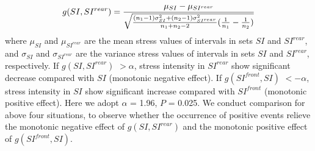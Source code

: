 \begin{equation}
\small{g(SI,SI^{rear})}= \frac{\mu_{SI}-\mu_{SI^{rear}}}{\sqrt{\frac{(n_1-1)\sigma^2_{SI}+(n_2-1)\sigma^2_{SI^{rear}}}{n_1+n_2-2}(\frac{1}{n_1}-\frac{1}{n_2})}}
\end{equation}
where $\mu_{SI}$ and $\mu_{SI^{rear}}$ are the mean stress values of intervals in sets $SI$ and $SI^{rear}$,
and $\sigma_{SI}$ and $\sigma_{SI^{rear}}$ are the variance stress values of intervals in sets $SI$ and $SI^{rear}$, respectively.
If $g(SI,SI^{rear})$ $> \alpha$, stress intensity in $SI^{rear}$ show significant decrease compared with $SI$ (monotonic negative effect).
If $g(SI^{front},SI)$ $< -\alpha$, stress intensity in $SI$ show significant increase compared with $SI^{front}$ (monotonic positive effect).
Here we adopt $\alpha$ = 1.96, $P$ = 0.025.
We conduct comparison for above four situations,
to observe whether the occurrence of positive events relieve the monotonic negative effect of $g(SI,SI^{rear})$
and the monotonic positive effect of $g(SI^{front},SI)$.

%
%
